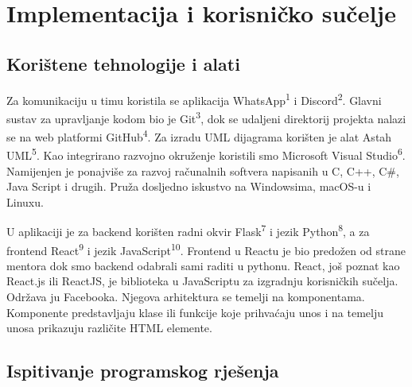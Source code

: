 \chapter{Implementacija i korisničko sučelje}
		
		
		\section{Korištene tehnologije i alati}
		

			

			 \textit{}Za komunikaciju u timu koristila se aplikacija WhatsApp\textsuperscript{1} i Discord\textsuperscript{2}. Glavni sustav za upravljanje kodom bio je Git\textsuperscript{3}, dok se udaljeni direktorij projekta nalazi se na web platformi GitHub\textsuperscript{4}. Za izradu UML dijagrama korišten je alat Astah UML\textsuperscript{5}. Kao integrirano razvojno okruženje koristili smo Microsoft Visual Studio\textsuperscript{6}. Namijenjen je ponajviše za razvoj računalnih softvera napisanih u C, C++, C#, Java Script i drugih. Pruža dosljedno iskustvo na Windowsima, macOS-u i Linuxu.
			 
			 U aplikaciji je za backend korišten radni okvir Flask\textsuperscript{7} i jezik Python\textsuperscript{8}, a za frontend React\textsuperscript{9} i jezik JavaScript\textsuperscript{10}. Frontend u Reactu je bio predožen od strane mentora dok smo backend odabrali sami raditi u pythonu. React, još poznat kao React.js ili ReactJS, je biblioteka u JavaScriptu za izgradnju korisničkih sučelja. Održava ju Facebooka. Njegova arhitektura se temelji na komponentama. Komponente predstavljaju klase ili funkcije koje prihvaćaju unos i na temelju unosa prikazuju različite HTML elemente.
			 
			 
			
			\eject 
		
	
		\section{Ispitivanje programskog rješenja}
			
